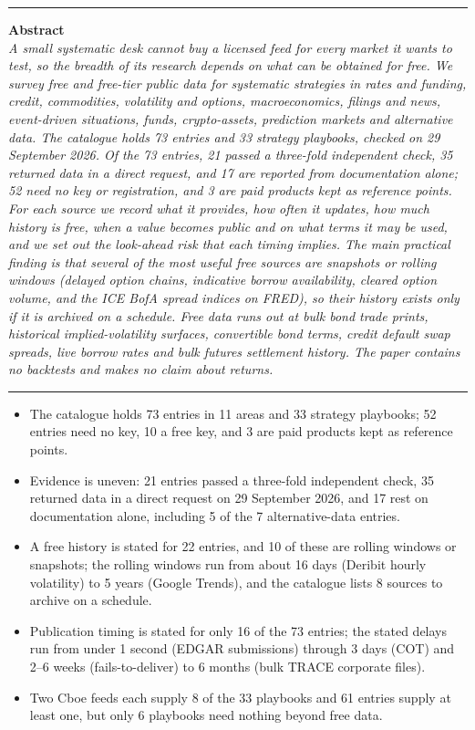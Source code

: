 \documentclass[10pt, a4paper, twocolumn]{article}
\newenvironment{keyfindings}
  {\begin{tcolorbox}[enhanced, colback=qbox, colframe=qnavy, boxrule=0pt, leftrule=2.5pt,
     arc=0pt, left=6pt, right=6pt, top=4pt, bottom=4pt, fontupper=\small,
     title={\small\bfseries Key findings}, coltitle=qnavy, colbacktitle=qbox, attach title to upper={\par\vspace{2pt}}]
   \begin{itemize}[nosep, leftmargin=*, label={\color{qnavy}\textbullet}]}
  {\end{itemize}\end{tcolorbox}}
\begin{document}
{\begin{center}
\begin{minipage}{0.92\textwidth}
\rule{\linewidth}{0.4pt}
\vspace{0.3em}
\textbf{Abstract}\\[0.3em]
\small\itshape
A small systematic desk cannot buy a licensed feed for every market it wants to test, so the breadth of its research depends on what can be obtained for free. We survey free and free-tier public data for systematic strategies in rates and funding, credit, commodities, volatility and options, macroeconomics, filings and news, event-driven situations, funds, crypto-assets, prediction markets and alternative data. The catalogue holds 73 entries and 33 strategy playbooks, checked on 29 September 2026. Of the 73 entries, 21 passed a three-fold independent check, 35 returned data in a direct request, and 17 are reported from documentation alone; 52 need no key or registration, and 3 are paid products kept as reference points. For each source we record what it provides, how often it updates, how much history is free, when a value becomes public and on what terms it may be used, and we set out the look-ahead risk that each timing implies. The main practical finding is that several of the most useful free sources are snapshots or rolling windows (delayed option chains, indicative borrow availability, cleared option volume, and the ICE BofA spread indices on FRED), so their history exists only if it is archived on a schedule. Free data runs out at bulk bond trade prints, historical implied-volatility surfaces, convertible bond terms, credit default swap spreads, live borrow rates and bulk futures settlement history. The paper contains no backtests and makes no claim about returns.
\vspace{0.3em}
\rule{\linewidth}{0.4pt}
\vspace{0.4em}
\normalfont
\begin{keyfindings}
\item The catalogue holds 73 entries in 11 areas and 33 strategy playbooks; 52 entries need no key, 10 a free key, and 3 are paid products kept as reference points.
\item Evidence is uneven: 21 entries passed a three-fold independent check, 35 returned data in a direct request on 29 September 2026, and 17 rest on documentation alone, including 5 of the 7 alternative-data entries.
\item A free history is stated for 22 entries, and 10 of these are rolling windows or snapshots; the rolling windows run from about 16 days (Deribit hourly volatility) to 5 years (Google Trends), and the catalogue lists 8 sources to archive on a schedule.
\item Publication timing is stated for only 16 of the 73 entries; the stated delays run from under 1 second (EDGAR submissions) through 3 days (COT) and 2--6 weeks (fails-to-deliver) to 6 months (bulk TRACE corporate files).
\item Two Cboe feeds each supply 8 of the 33 playbooks and 61 entries supply at least one, but only 6 playbooks need nothing beyond free data.
\end{keyfindings}
\end{minipage}


\end{center}}
\end{document}

